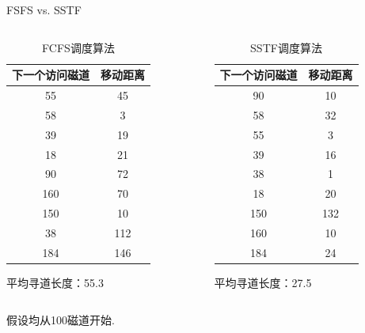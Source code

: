 \begin{frame}[fragile]{FSFS vs. SSTF}
  \begin{columns}[onlytextwidth,T]
    \begin{column}{0.45\textwidth}
      \begin{table}
        \caption{FCFS调度算法}
        \begin{tabular}{|c|c|}
          \hline
          下一个访问磁道 & 移动距离 \\ \hline
          55 & 45\\ \hline
          58 & 3\\ \hline
          39 & 19\\ \hline
          18 & 21\\ \hline
          90 & 72\\ \hline
          160 & 70\\ \hline
          150 & 10\\ \hline
          38 & 112\\ \hline
          184 & 146\\ \hline
        \end{tabular}
      \end{table}

      平均寻道长度：55.3
    \end{column}
    \begin{column}{0.45\textwidth}
      \begin{table}
        \caption{SSTF调度算法}
        \begin{tabular}{|c|c|}
          \hline
          下一个访问磁道 & 移动距离 \\ \hline
          90 & 10 \\ \hline
          58 & 32 \\ \hline
          55 & 3 \\ \hline
          39 & 16 \\ \hline
          38 & 1 \\ \hline
          18 & 20 \\ \hline
          150 & 132 \\ \hline
          160 & 10 \\ \hline
          184 & 24 \\ \hline
        \end{tabular}
      \end{table}

      平均寻道长度：27.5
    \end{column}
  \end{columns}

  假设均从100磁道开始.
\end{frame}


